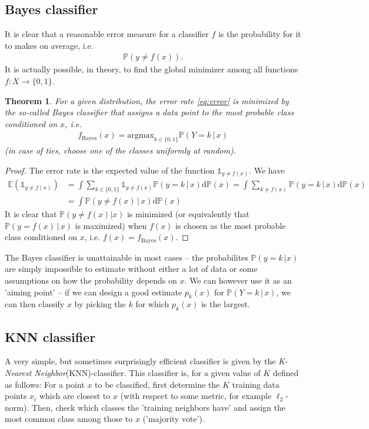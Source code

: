 \documentclass{article}
\newcommand{\erw}{\mathbb{E}} %
\newtheorem{theorem}{Theorem}
\newcommand{\one}{\mathds{1}}
\begin{document}
\subsection{Bayes classifier} 
It is clear that a reasonable error measure for a classifier $f$ is the probability for it to makes on average, i.e.
\begin{align} \label{eq:error}
    \mathbb{P}(y\neq f(x)).
\end{align}
It is actually possible, in theory, to find the global minimizer among all functions $f:X\to \{0,1\}$. 
\begin{theorem}
    For a given distribution, the error rate \eqref{eq:error} is minimized by the so-called \emph{Bayes classifier} that assigns a data point to the most probable class conditioned on $x$, i.e.
    \begin{align*}
        f_{\mathrm{Bayes}}(x) = \mathrm{argmax}_{k\in \{0,1\}} \mathbb{P}(Y=k \, \vert \, x)
    \end{align*}
    (in case of ties, choose one of the classes uniformly at random).
\end{theorem}
\begin{proof}
    The error rate is the expected value of the function $\one_{y \neq f(x)}$. We have
    \begin{align*}
        \erw(\one_{y\neq f(x)}) &= \int \sum_{k\in \{0,1\}} \one_{y\neq f(x)} \mathbb{P}(y=k \, \vert \, x) \mathrm{d}\mathbb{P}(x) = \int \sum_{k\neq f(x)}  \mathbb{P}(y=k \, \vert \, x) \mathrm{d}\mathbb{P}(x) \\
        &= \int  \mathbb{P}(y\neq f(x) \, \vert \, x) \mathrm{d}\mathbb{P}(x) 
    \end{align*}
    It is clear that $\mathbb{P}(y\neq f(x) \vert x)$ is minimized (or equivalently that $\mathbb{P}(y=f(x) \, \vert \, x)$ is maximized) when $f(x)$ is chosen as the most probable class conditioned on $x$, i.e. $f(x)=f_{\mathrm{Bayes}}(x)$.
\end{proof}
The Bayes classifier is unattainable in most cases -- the probabilites $\mathbb{P}(y=k \, \vert x)$ are simply impossible to estimate without either a lot of data or some assumptions on how the probability depends on $x$. We can however use it as an 'aiming point' -- if we can design a good estimate $p_k(x)$ for $\mathbb{P}(Y=k\, \vert \, x)$, we can then classify $x$ by picking the $k$ for which $p_k(x)$ is the largest.

\subsection{KNN classifier} A very simple, but sometimes surprisingly efficient classifier is given by the \emph{K-Nearest Neighbor}(KNN)-classifier. This classifier is, for a given value of $K$ defined as follows: For a point $x$ to be classified, first determine the $K$ training data points $x_i$ which are closest to $x$ (with respect to  some metric, for example $\ell_2$-norm). Then, check which classes the 'training neighbors have' and assign the most common class among those to $x$ ('majority vote').
\end{document}
